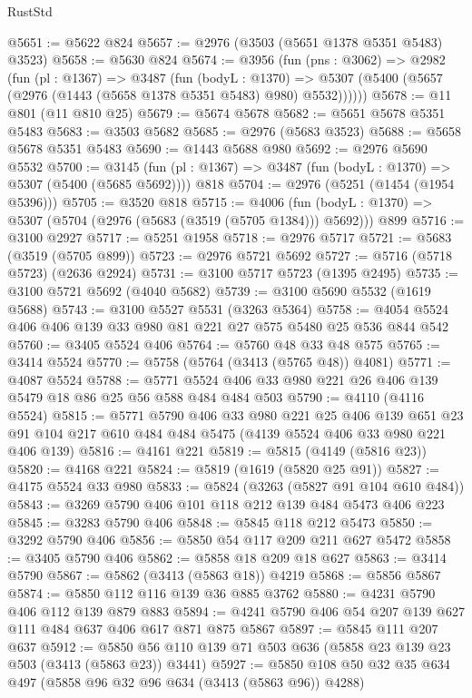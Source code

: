\begin{lexlean}{RustStd}
\begin{coremodule}
@5651 := @5622 @824
@5657 := @2976 (@3503 (@5651 @1378 @5351 @5483) @3523)
@5658 := @5630 @824
@5674 := @3956
    (fun (pns : @3062) =>
    @2982
      (fun (pl : @1367) =>
      @3487
        (fun (bodyL : @1370) =>
        @5307 (@5400 (@5657 (@2976 (@1443 (@5658 @1378 @5351 @5483) @980) @5532))))))
@5678 := @11 @801 (@11 @810 @25)
@5679 := @5674 @5678
@5682 := @5651 @5678 @5351 @5483
@5683 := @3503 @5682
@5685 := @2976 (@5683 @3523)
@5688 := @5658 @5678 @5351 @5483
@5690 := @1443 @5688 @980
@5692 := @2976 @5690 @5532
@5700 := @3145 (fun (pl : @1367) => @3487 (fun (bodyL : @1370) => @5307 (@5400 (@5685 @5692)))) @818
@5704 := @2976 (@5251 (@1454 (@1954 @5396)))
@5705 := @3520 @818
@5715 := @4006
    (fun (bodyL : @1370) => @5307 (@5704 (@2976 (@5683 (@3519 (@5705 @1384))) @5692)))
    @899
@5716 := @3100 @2927
@5717 := @5251 @1958
@5718 := @2976 @5717
@5721 := @5683 (@3519 (@5705 @899))
@5723 := @2976 @5721 @5692
@5727 := @5716 (@5718 @5723) (@2636 @2924)
@5731 := @3100 @5717 @5723 (@1395 @2495)
@5735 := @3100 @5721 @5692 (@4040 @5682)
@5739 := @3100 @5690 @5532 (@1619 @5688)
@5743 := @3100 @5527 @5531 (@3263 @5364)
@5758 := @4054 @5524 @406 @406 @139 @33 @980 @81 @221 @27 @575 @5480 @25 @536 @844 @542
@5760 := @3405 @5524 @406
@5764 := @5760 @48 @33 @48 @575
@5765 := @3414 @5524
@5770 := @5758 (@5764 (@3413 (@5765 @48)) @4081)
@5771 := @4087 @5524
@5788 := @5771 @5524 @406 @33 @980 @221 @26 @406 @139 @5479 @18 @86 @25 @56 @588 @484 @484 @503
@5790 := @4110 (@4116 @5524)
@5815 := @5771
    @5790
    @406
    @33
    @980
    @221
    @25
    @406
    @139
    @651
    @23
    @91
    @104
    @217
    @610
    @484
    @484
    @5475
    (@4139 @5524 @406 @33 @980 @221 @406 @139)
@5816 := @4161 @221
@5819 := @5815 (@4149 (@5816 @23))
@5820 := @4168 @221
@5824 := @5819 (@1619 (@5820 @25 @91))
@5827 := @4175 @5524 @33 @980
@5833 := @5824 (@3263 (@5827 @91 @104 @610 @484))
@5843 := @3269 @5790 @406 @101 @118 @212 @139 @484 @5473 @406 @223
@5845 := @3283 @5790 @406
@5848 := @5845 @118 @212 @5473
@5850 := @3292 @5790 @406
@5856 := @5850 @54 @117 @209 @211 @627 @5472
@5858 := @3405 @5790 @406
@5862 := @5858 @18 @209 @18 @627
@5863 := @3414 @5790
@5867 := @5862 (@3413 (@5863 @18)) @4219
@5868 := @5856 @5867
@5874 := @5850 @112 @116 @139 @36 @885 @3762
@5880 := @4231 @5790 @406 @112 @139 @879 @883
@5894 := @4241 @5790 @406 @54 @207 @139 @627 @111 @484 @637 @406 @617 @871 @875 @5867
@5897 := @5845 @111 @207 @637
@5912 := @5850 @56 @110 @139 @71 @503 @636 (@5858 @23 @139 @23 @503 (@3413 (@5863 @23)) @3441)
@5927 := @5850 @108 @50 @32 @35 @634 @497 (@5858 @96 @32 @96 @634 (@3413 (@5863 @96)) @4288)

\end{coremodule}
\end{lexlean}
